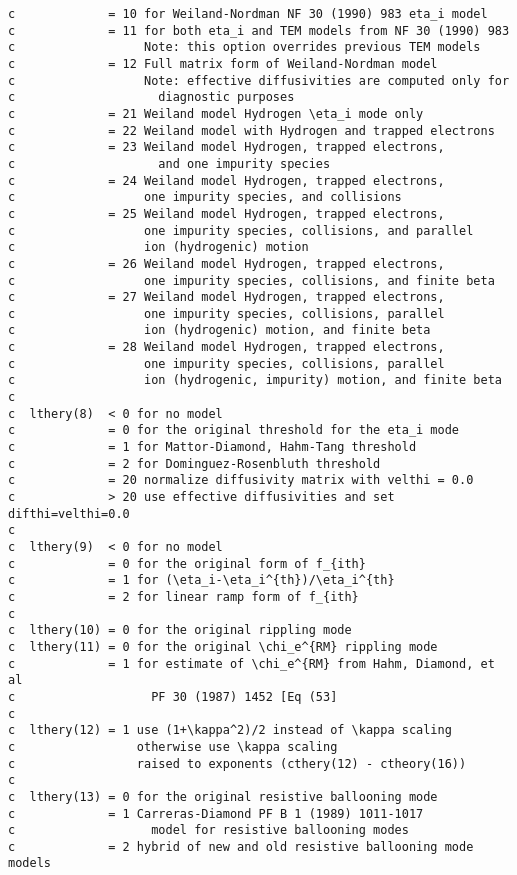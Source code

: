 \begin{verbatim}
c             = 10 for Weiland-Nordman NF 30 (1990) 983 eta_i model
c             = 11 for both eta_i and TEM models from NF 30 (1990) 983 
c                  Note: this option overrides previous TEM models
c             = 12 Full matrix form of Weiland-Nordman model
c                  Note: effective diffusivities are computed only for 
c                    diagnostic purposes
c             = 21 Weiland model Hydrogen \eta_i mode only
c             = 22 Weiland model with Hydrogen and trapped electrons
c             = 23 Weiland model Hydrogen, trapped electrons,
c                    and one impurity species
c             = 24 Weiland model Hydrogen, trapped electrons,
c                  one impurity species, and collisions
c             = 25 Weiland model Hydrogen, trapped electrons,
c                  one impurity species, collisions, and parallel
c                  ion (hydrogenic) motion
c             = 26 Weiland model Hydrogen, trapped electrons,
c                  one impurity species, collisions, and finite beta
c             = 27 Weiland model Hydrogen, trapped electrons,
c                  one impurity species, collisions, parallel
c                  ion (hydrogenic) motion, and finite beta
c             = 28 Weiland model Hydrogen, trapped electrons,
c                  one impurity species, collisions, parallel
c                  ion (hydrogenic, impurity) motion, and finite beta
c
c  lthery(8)  < 0 for no model
c             = 0 for the original threshold for the eta_i mode
c             = 1 for Mattor-Diamond, Hahm-Tang threshold
c             = 2 for Dominguez-Rosenbluth threshold
c             = 20 normalize diffusivity matrix with velthi = 0.0
c             > 20 use effective diffusivities and set difthi=velthi=0.0
c
c  lthery(9)  < 0 for no model
c             = 0 for the original form of f_{ith}
c             = 1 for (\eta_i-\eta_i^{th})/\eta_i^{th}
c             = 2 for linear ramp form of f_{ith}
c
c  lthery(10) = 0 for the original rippling mode
c  lthery(11) = 0 for the original \chi_e^{RM} rippling mode
c             = 1 for estimate of \chi_e^{RM} from Hahm, Diamond, et al
c                   PF 30 (1987) 1452 [Eq (53]
c
c  lthery(12) = 1 use (1+\kappa^2)/2 instead of \kappa scaling
c                 otherwise use \kappa scaling
c                 raised to exponents (cthery(12) - ctheory(16))
c
c  lthery(13) = 0 for the original resistive ballooning mode
c             = 1 Carreras-Diamond PF B 1 (1989) 1011-1017
c                   model for resistive ballooning modes
c             = 2 hybrid of new and old resistive ballooning mode models

\end{verbatim}
